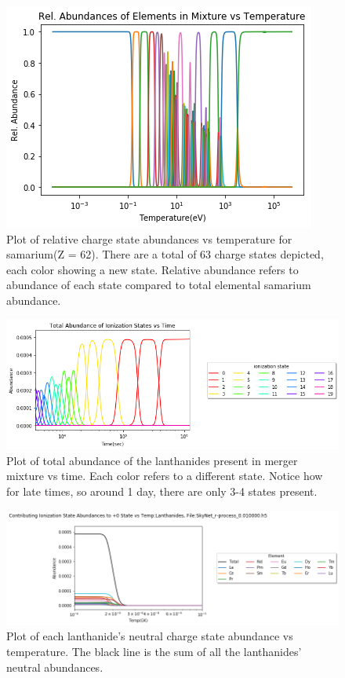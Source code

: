 \documentclass[11pt,a4paper]{article}
\begin{document}
\begin{figure}[h!]
  \includegraphics[scale = .75]{samarium.png}
  \centering
  \caption{Plot of relative charge state abundances vs temperature for samarium(Z = 62). There are a total of 63 charge states depicted, each color showing a new state. Relative abundance refers to abundance of each state compared to total elemental samarium abundance.}
\end{figure} 


\begin{figure}[h!]
  \includegraphics[scale = .65]{total.png}
  \centering
  \caption{Plot of total abundance of the lanthanides present in merger mixture vs time. Each color refers to a different state. Notice how for late times, so around 1 day, there are only 3-4 states present.}
\end{figure} 


\begin{figure}[h!]
  \includegraphics[scale = .6]{neutral.png}
  \caption{Plot of each lanthanide's neutral charge state abundance vs temperature. The black line is the sum of all the lanthanides' neutral abundances. }
\end{figure} 
\end{document}
